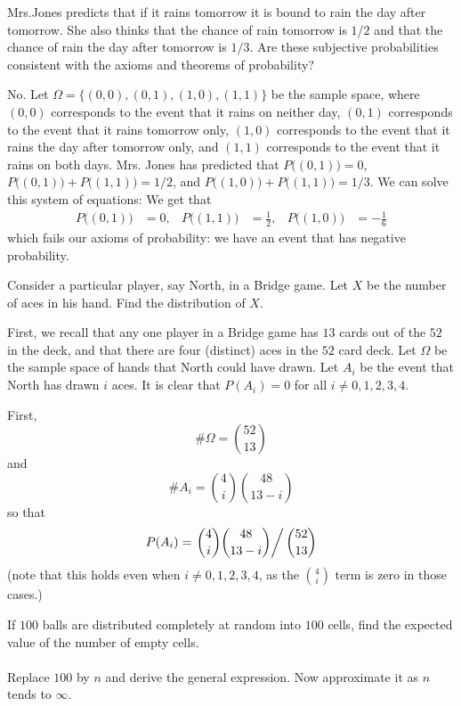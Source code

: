 \begin{problem}
  Mrs.\@ Jones predicts that if it rains tomorrow it is bound to rain the
  day after tomorrow. She also thinks that the chance of rain tomorrow is
  \(1/2\) and that the chance of rain the day after tomorrow is
  \(1/3\). Are these subjective probabilities consistent with the axioms
  and theorems of probability?
\end{problem}
\begin{solution}
  No. Let \(\Omega=\{(0,0),(0,1),(1,0),(1,1)\}\) be the sample space, where
  \((0,0)\) corresponds to the event that it rains on neither day,
  \((0,1)\) corresponds to the event that it rains tomorrow only, \((1,0)\)
  corresponds to the event that it rains the day after tomorrow only, and
  \((1,1)\) corresponds to the event that it rains on both days. Mrs.\@
  Jones has predicted that \(P\bigl((0,1)\bigr)=0 \),
  \(P\bigl((0,1)\bigr)+P\bigl((1,1)\bigr)=1/2\), and
  \(P\bigl((1,0)\bigr)+P\bigl((1,1)\bigr)=1/3\). We can solve this system
  of equations: We get that
  \begin{align*}
    P\bigl((0,1)\bigr)&=0,
    &P\bigl((1,1)\bigr)&=\frac{1}{2},
    &P\bigl((1,0)\bigr)&=-\frac{1}{6}
  \end{align*}
  which fails our axioms of probability: we have an event that has negative
  probability.
\end{solution}
\newpage

\begin{problem}[Handout 1, \# 16]
  Consider a particular player, say North, in a Bridge game. Let \(X\) be
  the number of aces in his hand. Find the distribution of \(X\).
\end{problem}
\begin{solution}
  First, we recall that any one player in a Bridge game has \(13\) cards
  out of the \(52\) in the deck, and that there are four (distinct) aces in
  the \(52\) card deck. Let \(\Omega\) be the sample space of hands that
  North could have drawn. Let \(A_i\) be the event that North has drawn
  \(i\) aces. It is clear that \(P(A_i) = 0\) for all \(i \neq 0,1,2,3,4\).

  First,
  \[
    \# \Omega= \binom{52}{13}
  \]
  and
  \[
    \# A_i= \binom{4}{i} \binom{48}{13-i}
  \]
  so that
  \[
    P(A_i)=\left.\binom{4}{i}\binom{48}{13-i}\right/\binom{52}{13}
  \]
  (note that this holds even when \(i \neq 0,1,2,3,4\), as the
  \(\displaystyle\binom{4}{i}\) term is zero in those cases.)
\end{solution}
\newpage

\begin{problem}[Handout 1, \# 20]
  If \(100\) balls are distributed completely at random into \(100\) cells,
  find the expected value of the number of empty cells.
  \\\\
  Replace \(100\) by \(n\) and derive the general expression. Now
  approximate it as \(n\) tends to \(\infty\).
\end{problem}
\begin{solution}
\end{solution}

